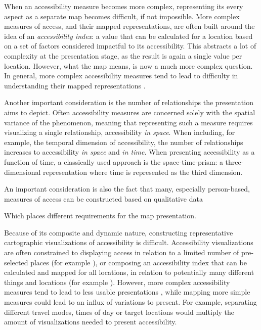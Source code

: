 When an accessibility measure becomes more complex,
representing its every aspect as a separate map becomes difficult,
if not impossible.
More complex measures of access, and their mapped representations,
are often built around the idea of
an \textit{accessibility index}:
a value that can be calculated for a location
based on a set of factors considered impactful to its accessibility.
This abstracts a lot of complexity at the presentation stage,
as the result is again a single value per location.  %
However, what the map means, is now a much more complex question.
In general, more complex accessibility measures tend to lead to
difficulty in understanding their mapped representations \parencite{te2014}.

Another important consideration is
the number of relationships the presentation aims to depict.
Often accessibility measures are concerned solely with
the spatial variance of the phenomenon, meaning that
representing such a measure requires visualizing a single relationship,
accessibility \textit{in space}.
When including, for example, the temporal dimension of accessibility,
the number of relationships increases to
accessibility \textit{in space} and \textit{in time}.
When presenting accessibility as a function of time,
a classically used approach is the space-time-prism:
a three-dimensional representation where
time is represented as the third dimension.


An important consideration is also the fact that
many, especially person-based, measures of access can be constructed
based on qualitative data

Which places different requirements for the map presentation.



Because of its composite and dynamic nature,
constructing representative cartographic visualizations of accessibility is difficult.
Accessibility visualizations are often constrained
to displaying access in relation to
a limited number of pre-selected places (for example \textcite{wei2018}),
or composing an accessibility index
that can be calculated and mapped for all locations,
in relation to potentially many different things and locations
(for example \textcite{kim2019}).
However, more complex accessibility measures tend to lead to
less usable presentations \parencite{te2014},
while mapping more simple measures could lead to an influx of variations to present.
For example, separating different travel modes, times of day or target locations
would multiply the amount of visualizations needed to present accessibility.

